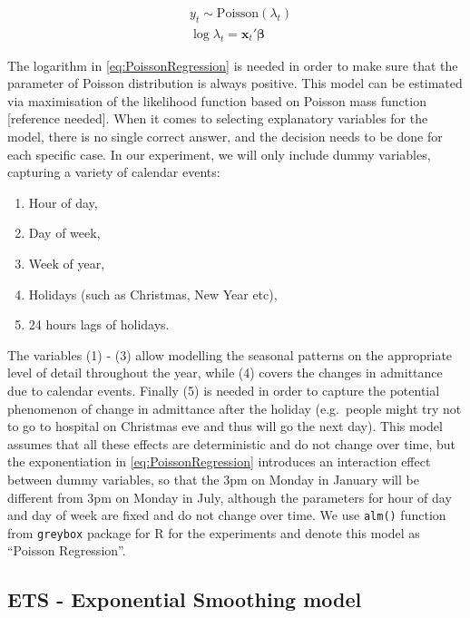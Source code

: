 \documentclass[]{elsarticle} %
\providecommand{\tightlist}{%
  \setlength{\itemsep}{0pt}\setlength{\parskip}{0pt}}
\begin{document}
\begin{equation}
  \begin{aligned}
    & {y}_t \sim \mathrm{Poisson} \left( \lambda_t \right) \\
    & \log \lambda_t = \mathbf{x}_t' \boldsymbol{\beta}
  \end{aligned}
\label{eq:PoissonRegression}
\end{equation}

The logarithm in \eqref{eq:PoissonRegression} is needed in order to make sure that the parameter of Poisson distribution is always positive. This model can be estimated via maximisation of the likelihood function based on Poisson mass function {[}reference needed{]}. When it comes to selecting explanatory variables for the model, there is no single correct answer, and the decision needs to be done for each specific case. In our experiment, we will only include dummy variables, capturing a variety of calendar events:

\begin{enumerate}
\def\labelenumi{\arabic{enumi}.}
\tightlist
\item
  Hour of day,
\item
  Day of week,
\item
  Week of year,
\item
  Holidays (such as Christmas, New Year etc),
\item
  24 hours lags of holidays.
\end{enumerate}

The variables (1) - (3) allow modelling the seasonal patterns on the appropriate level of detail throughout the year, while (4) covers the changes in admittance due to calendar events. Finally (5) is needed in order to capture the potential phenomenon of change in admittance after the holiday (e.g.~people might try not to go to hospital on Christmas eve and thus will go the next day). This model assumes that all these effects are deterministic and do not change over time, but the exponentiation in \eqref{eq:PoissonRegression} introduces an interaction effect between dummy variables, so that the 3pm on Monday in January will be different from 3pm on Monday in July, although the parameters for hour of day and day of week are fixed and do not change over time. We use \texttt{alm()} function from \texttt{greybox} package \citep{Svetunkov2021Greybox} for R \citep{RTeam2021} for the experiments and denote this model as ``Poisson Regression''.

\hypertarget{ets---exponential-smoothing-model}{%
\subsection{ETS - Exponential Smoothing model}\label{ets---exponential-smoothing-model}}
\end{document}
